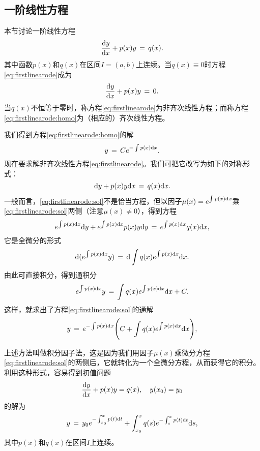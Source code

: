 \subsection{一阶线性方程}
本节讨论{\heiti 一阶线性}方程
\begin{equation}\label{eq:firstlinearode}
\frac{\mathrm{d} y}{\mathrm{d} x}+p(x)y\,=\,q(x).
\end{equation}
其中函数$p(x)$和$q(x)$在区间$I=(a,b)$上连续。当$q(x)\equiv0$时方程\eqref{eq:firstlinearode}成为
\begin{equation}\label{eq:firstlinearode:homo}
\frac{\mathrm{d} y}{\mathrm{d} x}+p(x)y\,=\,0.
\end{equation}
当$q(x)$不恒等于零时，称方程\eqref{eq:firstlinearode}为{\heiti 非齐次}线性方程；而称方程\eqref{eq:firstlinearode:homo}为（相应的）{\heiti 齐次}线性方程。\par
我们得到方程\eqref{eq:firstlinearode:homo}的解
\begin{equation}\label{eq:firstlinearode:homo:sol}
y\,=\,Ce^{-\int p(x)\mathrm{d} x}.
\end{equation}
现在要求解非齐次线性方程\eqref{eq:firstlinearode}。我们可把它改写为如下的对称形式：
\begin{equation}\label{eq:firstlinearode:sol}
\mathrm{d} y+p(x)y\mathrm{d} x\,=\,q(x)\mathrm{d} x.
\end{equation}
一般而言，\eqref{eq:firstlinearode:sol}不是恰当方程，但以因子$\mu(x)=e^{\int p(x)\mathrm{d} x}$乘\eqref{eq:firstlinearode:sol}两侧（注意$\mu(x)\neq 0$），得到方程
$$e^{\int p(x)\mathrm{d} x}\mathrm{d} y+e^{\int p(x)\mathrm{d} x}p(x)y\mathrm{d} y\,=\,e^{\int p(x)\mathrm{d} x}q(x)\mathrm{d} x,$$
它是全微分的形式
$$\mathrm{d}(e^{\int p(x)\mathrm{d} x}y)\,=\,\mathrm{d}\int q(x)e^{\int p(x)\mathrm{d} x}\mathrm{d} x.$$
由此可直接积分，得到通积分
$$e^{\int p(x)\mathrm{d} x}y\,=\,\int q(x)e^{\int p(x)\mathrm{d} x}\mathrm{d} x+C.$$
这样，就求出了方程\eqref{eq:firstlinearode:sol}的通解
\begin{equation}\label{eq:firstlinearode:sol2}
y\,=\,e^{-\int p(x)\mathrm{d} x}\Bigg(C+\int q(x)e^{\int p(x)\mathrm{d} x}\mathrm{d} x\Bigg),
\end{equation}\par
上述方法叫做{\heiti 积分因子法}，这是因为我们用因子$\mu(x)$乘微分方程\eqref{eq:firstlinearode:sol}的两侧后，它就转化为一个全微分方程，从而获得它的积分。
利用这种形式，容易得到初值问题
\begin{equation}\label{eq:firstlinearode:initval}
\frac{\mathrm{d} y}{\mathrm{d} x}+p(x)y=q(x),\quad y(x_0)=y_0
\end{equation}
的解为
\begin{equation}\label{eq:firstlinearode:initval:sol}
y\,=\,y_0e^{-\int_{x_0}^xp(t)\mathrm{d} t}+\int_{x_0}^xq(s)e^{-\int_s^xp(t)\mathrm{d} t}\mathrm{d} s,
\end{equation}
其中$p(x)$和$q(x)$在区间$I$上连续。

